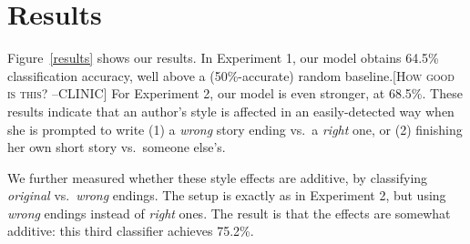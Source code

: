 \documentclass[11pt,a4paper]{article}
\newcommand{\figref}[1]{Figure~\ref{#1}}
\newcommand{\isectionb}[1]{\section{#1}\label{ssec:#1}}
\newcommand{\resolved}[1]{}
\newcommand{\nascomment}[1]{{\color{blue}\textsc{[#1 --nas]}}}
\newcommand{\clinic}[1]{{\color{magenta}\textsc{[#1 --CLINIC]}}}
\begin{document}
\isectionb{Results}
\figref{results} shows our results.
In Experiment 1, our model obtains 64.5\%
classification accuracy, well above a (50\%-accurate) random baseline.\clinic{How good is this?}
For Experiment 2, our model is even stronger, at 68.5\%.
These results indicate that an author's style is affected in an
easily-detected way when she is prompted to write (1) a \emph{wrong} story ending vs.~a
\emph{right} one, or (2) finishing her own short story vs.~someone else's.

We further measured whether these style effects are additive, by
classifying \emph{original} vs.~\emph{wrong} endings.  The setup is
exactly as in Experiment 2, but using \emph{wrong} endings instead of
\emph{right} ones.  The result is that the effects are somewhat
additive:  this third classifier achieves 75.2\%.

 \resolved{
\begin{figure}
\begin{tikzpicture}
\small
    \begin{axis}[
        width  = 0.45*\textwidth,
        height = 4cm,
        ybar=2*\pgflinewidth,
        ymajorgrids = true,
        ylabel = {Classification Performance},
        symbolic x coords={{\it Correct/Wrong}, {\it Original/New}, {\it Original/Wrong}},
        xtick = data,
        scaled y ticks = false,
        ymin=0.4,
        legend cell align=left,
        legend style={
                at={(1,1.05)},
                anchor=south east,
                column sep=1ex
        }
    ]
        \addplot[style={bblue,fill=bblue,mark=none}]
            coordinates {({\it Correct/Wrong}, 0.5) ({\it Original/New}, 0.5) ({\it Original/Wrong},.5)};

        \addplot[style={rred,fill=rred,mark=none}]
            coordinates {({\it Correct/Wrong}, 0.645) ({\it Original/New}, 0.685) ({\it Original/Wrong},0.756)};

        \legend{Random Baseline, Our Model}
    \end{axis}
\end{tikzpicture}
\caption{\label{results} Results of  experiments 1 and 2 (left two charts). 
Rightmost graph shows a control experiment which classifies {\it
  original} endings vs \textit{\textbf{wrong}}
endings. \nascomment{this is overkill.  I suggest replacing it with a
  table that just shows our model, no baseline, and reiterate in the
  caption that our setup implies a 50\%-accurate random baseline.
  Also, I like including the third comparison, but I don't
  see how it's a ``control.'' }}
\end{figure}
}
\end{document}
